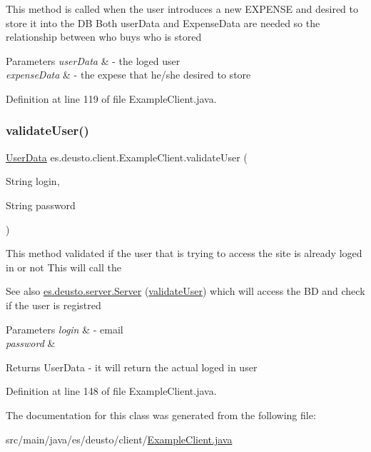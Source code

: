 This method is called when the user introduces a new E\+X\+P\+E\+N\+SE and desired to store it into the DB Both user\+Data and Expense\+Data are needed so the relationship between who buys who is stored 
\begin{DoxyParams}{Parameters}
{\em user\+Data} & -\/ the loged user \\
\hline
{\em expense\+Data} & -\/ the expese that he/she desired to store \\
\hline
\end{DoxyParams}


Definition at line 119 of file Example\+Client.\+java.

\mbox{\label{classes_1_1deusto_1_1client_1_1_example_client_a740fa7000d0cd30603ce100b299ba8ba}} 
\subsubsection{\texorpdfstring{validate\+User()}{validateUser()}}
{\footnotesize\ttfamily \hyperlink{classes_1_1deusto_1_1serialization_1_1_user_data}{User\+Data} es.\+deusto.\+client.\+Example\+Client.\+validate\+User (\begin{DoxyParamCaption}\item[{String}]{login,  }\item[{String}]{password }\end{DoxyParamCaption})}

This method validated if the user that is trying to access the site is already loged in or not This will call the \begin{DoxySeeAlso}{See also}
\hyperlink{classes_1_1deusto_1_1server_1_1_server}{es.\+deusto.\+server.\+Server} (\hyperlink{classes_1_1deusto_1_1client_1_1_example_client_a740fa7000d0cd30603ce100b299ba8ba}{validate\+User}) which will access the BD and check if the user is registred 
\end{DoxySeeAlso}

\begin{DoxyParams}{Parameters}
{\em login} & -\/ email \\
\hline
{\em password} & \\
\hline
\end{DoxyParams}
\begin{DoxyReturn}{Returns}
User\+Data -\/ it will return the actual loged in user 
\end{DoxyReturn}


Definition at line 148 of file Example\+Client.\+java.



The documentation for this class was generated from the following file\+:\begin{DoxyCompactItemize}
\item 
src/main/java/es/deusto/client/\hyperlink{_example_client_8java}{Example\+Client.\+java}\end{DoxyCompactItemize}
